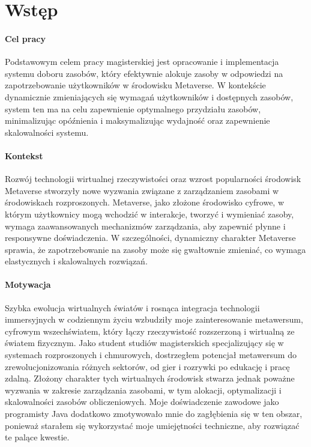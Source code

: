 \chapter{Wstęp}


\subsubsection{Cel pracy}

Podstawowym celem pracy magisterskiej jest opracowanie i implementacja systemu doboru zasobów, który efektywnie alokuje zasoby w odpowiedzi na zapotrzebowanie użytkowników w środowisku Metaverse. W kontekście dynamicznie zmieniających się wymagań użytkowników i dostępnych zasobów, system ten ma na celu zapewnienie optymalnego przydziału zasobów, minimalizując opóźnienia i maksymalizując wydajność oraz zapewnienie skalowalności systemu.

\subsubsection{Kontekst}

Rozwój technologii wirtualnej rzeczywistości oraz wzrost popularności środowisk Metaverse stworzyły nowe wyzwania związane z zarządzaniem zasobami w środowiskach rozproszonych. Metaverse, jako złożone środowisko cyfrowe, w którym użytkownicy mogą wchodzić w interakcje, tworzyć i wymieniać zasoby, wymaga zaawansowanych mechanizmów zarządzania, aby zapewnić płynne i responsywne doświadczenia. W szczególności, dynamiczny charakter Metaverse sprawia, że zapotrzebowanie na zasoby może się gwałtownie zmieniać, co wymaga elastycznych i skalowalnych rozwiązań.

\subsubsection{Motywacja}

Szybka ewolucja wirtualnych światów i rosnąca integracja technologii immersyjnych w codziennym życiu wzbudziły moje zainteresowanie metawersum, cyfrowym wszechświatem, który łączy rzeczywistość rozszerzoną i wirtualną ze światem fizycznym. Jako student studiów magisterskich specjalizujący się w systemach rozproszonych i chmurowych, dostrzegłem potencjał metawersum do zrewolucjonizowania różnych sektorów, od gier i rozrywki po edukację i pracę zdalną. Złożony charakter tych wirtualnych środowisk stwarza jednak poważne wyzwania w zakresie zarządzania zasobami, w tym alokacji, optymalizacji i skalowalności zasobów obliczeniowych. Moje doświadczenie zawodowe jako programisty Java dodatkowo zmotywowało mnie do zagłębienia się w ten obszar, ponieważ starałem się wykorzystać moje umiejętności techniczne, aby rozwiązać te palące kwestie.

